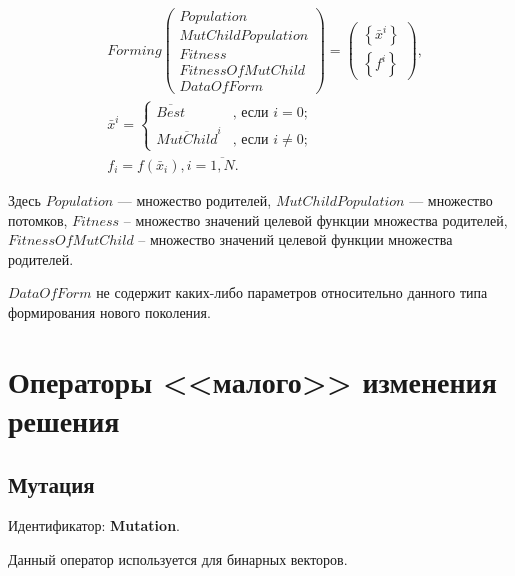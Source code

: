 \documentclass[a4paper,12pt]{article}
\begin{document}
\begin{align}
\label{SetOfOperatorsAlgorithms:eq:OnlyOffspringWithBestGenerationForming}
&Forming \left( \begin{array}{c} Population\\MutChildPopulation\\Fitness\\FitnessOfMutChild\\DataOfForm\end{array}\right) =\left( \begin{array}{c} \left\lbrace \bar{x}^i\right\rbrace \\\left\lbrace f^i\right\rbrace\end{array}\right),\\&\bar{x}^i=\left\lbrace \begin{aligned}
\overline{Best}&\text{, если }i=0; \\ \overline{MutChild}^i&\text{, если }i\neq 0;
\end{aligned}\right.\nonumber\\
&f_i=f\left( \bar{x}_i\right), i=\overline{1,N}.\nonumber
\end{align}

Здесь $ Population $ --- множество родителей, $MutChildPopulation$ --- множество потомков, $ Fitness $ -- множество значений целевой функции множества родителей, $ FitnessOfMutChild $ -- множество значений целевой функции множества родителей. 

$ DataOfForm $ не содержит каких-либо параметров относительно данного типа формирования нового поколения.


\section{Операторы <<малого>> изменения решения}\label{SetOfOperatorsAlgorithms:section_change}

\subsection{Мутация} \label{SetOfOperatorsAlgorithms:subsection_Mutation}

Идентификатор: \textbf{Mutation}.

Данный оператор используется для бинарных векторов.
\end{document}
